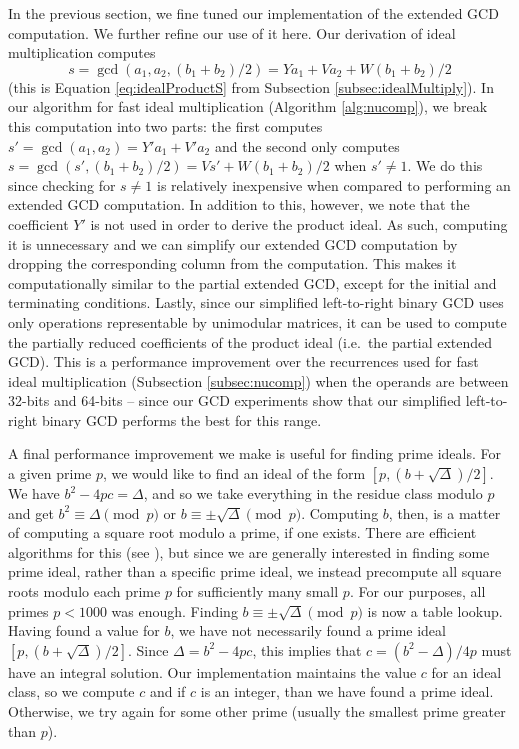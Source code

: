 \documentclass{ucalgthes1}
\theoremstyle{definition}
\begin{document}
In the previous section, we fine tuned our implementation of the extended GCD computation.  We further refine our use of it here.  Our derivation of ideal multiplication computes
\[
s = \gcd(a_1, a_2, (b_1+b_2)/2) = Ya_1 + Va_2 + W(b_1+b_2)/2
\]
(this is Equation \ref{eq:idealProductS} from Subsection \ref{subsec:idealMultiply}).  In our algorithm for fast ideal multiplication (Algorithm \ref{alg:nucomp}), we break this computation into two parts: the first computes $s' = \gcd(a_1, a_2) = Y'a_1 + V'a_2$ and the second only computes $s = \gcd(s', (b_1 + b_2)/2) = Vs' + W(b_1 + b_2)/2$ when $s' \neq 1$.  We do this since checking for $s \neq 1$ is relatively inexpensive when compared to performing an extended GCD computation.  In addition to this, however, we note that the coefficient $Y'$ is not used in order to derive the product ideal.  As such, computing it is unnecessary and we can simplify our extended GCD computation by dropping the corresponding column from the computation.  This makes it computationally similar to the partial extended GCD, except for the initial and terminating conditions. Lastly, since our simplified left-to-right binary GCD uses only operations representable by unimodular matrices, it can be used to compute the partially reduced coefficients of the product ideal (i.e.\ the partial extended GCD).  This is a performance improvement over the recurrences used for fast ideal multiplication (Subsection \ref{subsec:nucomp}) when the operands are between 32-bits and 64-bits -- since our GCD experiments show that our simplified left-to-right binary GCD performs the best for this range.

A final performance improvement we make is useful for finding prime ideals.  For a given prime $p$, we would like to find an ideal of the form $[p, (b + \sqrt\Delta)/2]$.  We have $b^2 - 4pc = \Delta$, and so we take everything in the residue class modulo $p$ and get $b^2 \equiv \Delta \pmod p$ or $b \equiv \pm\sqrt\Delta \pmod p$.  Computing $b$, then, is a matter of computing a square root modulo a prime, if one exists.  There are efficient algorithms for this (see \cite{Bach1996}), but since we are generally interested in finding some prime ideal, rather than a specific prime ideal, we instead precompute all square roots modulo each prime $p$ for sufficiently many small $p$.  For our purposes, all primes $p < 1000$ was enough.  Finding $b \equiv \pm\sqrt\Delta \pmod p$ is now a table lookup. Having found a value for $b$, we have not necessarily found a prime ideal $[p, (b + \sqrt\Delta)/2]$.  Since $\Delta = b^2 - 4pc$, this implies that $c = (b^2 - \Delta)/4p$ must have an integral solution.  Our implementation maintains the value $c$ for an ideal class, so we compute $c$ and if $c$ is an integer, than we have found a prime ideal.  Otherwise, we try again for some other prime (usually the smallest prime greater than $p$).
\end{document}
